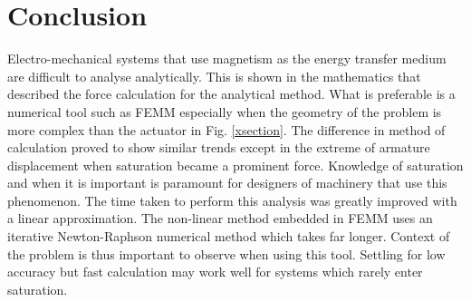 \documentclass[a4paper]{IEEEtran}
\begin{document}
\section{Conclusion}
Electro-mechanical systems that use magnetism as the energy transfer medium are difficult to analyse analytically. This is shown in the mathematics that described the force calculation for the analytical method. What is preferable is a numerical tool such as FEMM especially when the geometry of the problem is more complex than the actuator in Fig. \ref{xsection}. The difference in method of calculation proved to show similar trends except in the extreme of armature displacement when saturation became a prominent force. Knowledge of saturation and when it is important is paramount for designers of machinery that use this phenomenon. The time taken to perform this analysis was greatly improved with a linear approximation. The non-linear method embedded in FEMM uses an iterative Newton-Raphson numerical method which takes far longer. Context of the problem is thus important to observe when using this tool. Settling for low accuracy but fast calculation may work well for systems which rarely enter saturation. 


\printbibliography

% 

% 
 
% 
\end{document}
